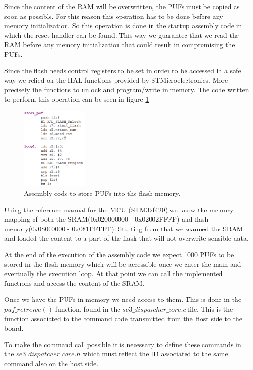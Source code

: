 Since the content of the RAM will be overwritten, the PUFs must be copied as soon as possible. For this reason this operation has to be done before any memory initialization. So this operation is done in the startup assembly code in which the reset handler can be found. This way we guarantee that we read the RAM before any memory initialization that could result in compromising the PUFs.

Since the flash needs control registers to be set in order to be accessed in a safe way we relied on the HAL functions provided by STMicroelectronics. More precisely the functions to unlock and program/write in memory. The code written to perform this operation can be seen in figure \ref{fig:code_assembly}

\begin{figure}[h!]
	\centering
	\vspace{0.5cm}
	\includegraphics[width = 0.3\textwidth]{images/code_assembly.png}
	\caption{Assembly code to store PUFs into the flash memory. }
	\label{fig:code_assembly}
\end{figure}

Using the reference manual for the MCU (STM32f429) we know the memory mapping of both the SRAM(0x020000000 -  0x02002FFFF) and flash memory(0x08000000 - 0x081FFFFF). Starting from that we scanned the SRAM and loaded the content to a part of the flash that will not overwrite sensible data.

At the end of the execution of the assembly code we expect 1000 PUFs to be stored in the flash memory which will be accessible once we enter the main and eventually the execution loop. At that point we can call the implemented functions and access the content of the SRAM.

Once we have the PUFs in memory we need access to them. This is done in the $puf\_retreive()$ function, found in the $se3\_dispatcher\_core.c$ file. This is the function associated to the command code transmitted from the Host side to the board.

To make the command call possible it is necessary to define these commands in the $se3\_dispatcher\_core.h$ which must reflect the ID associated to the same command also on the host side.

